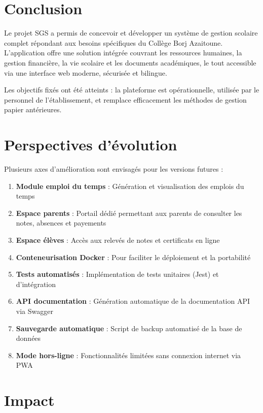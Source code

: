 \documentclass[12pt,a4paper]{report}
\begin{document}
\section{Conclusion}

Le projet SGS a permis de concevoir et développer un système de gestion scolaire complet répondant aux besoins spécifiques du Collège Borj Azaitoune. L'application offre une solution intégrée couvrant les ressources humaines, la gestion financière, la vie scolaire et les documents académiques, le tout accessible via une interface web moderne, sécurisée et bilingue.

Les objectifs fixés ont été atteints : la plateforme est opérationnelle, utilisée par le personnel de l'établissement, et remplace efficacement les méthodes de gestion papier antérieures.

\section{Perspectives d'évolution}

Plusieurs axes d'amélioration sont envisagés pour les versions futures :

\begin{enumerate}
    \item \textbf{Module emploi du temps} : Génération et visualisation des emplois du temps
    \item \textbf{Espace parents} : Portail dédié permettant aux parents de consulter les notes, absences et payements
    \item \textbf{Espace élèves} : Accès aux relevés de notes et certificats en ligne
    \item \textbf{Conteneurisation Docker} : Pour faciliter le déploiement et la portabilité
    \item \textbf{Tests automatisés} : Implémentation de tests unitaires (Jest) et d'intégration
    \item \textbf{API documentation} : Génération automatique de la documentation API via Swagger
    \item \textbf{Sauvegarde automatique} : Script de backup automatisé de la base de données
    \item \textbf{Mode hors-ligne} : Fonctionnalités limitées sans connexion internet via PWA
\end{enumerate}

\section{Impact}
\end{document}
